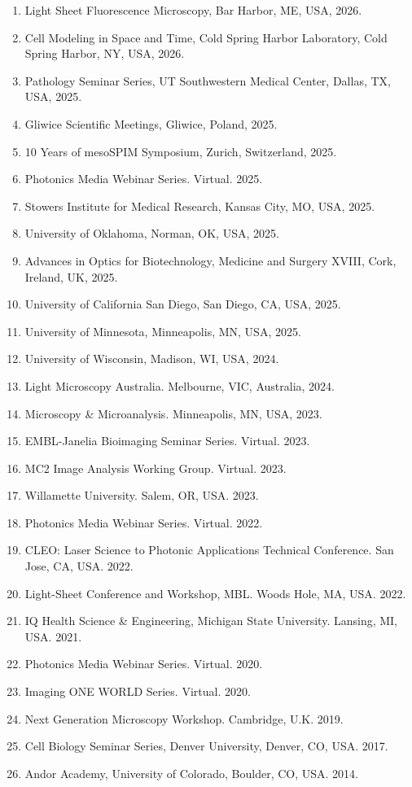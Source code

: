 \begin{enumerate}
\item Light Sheet Fluorescence Microscopy, Bar Harbor, ME, USA, 2026.
\item Cell Modeling in Space and Time, Cold Spring Harbor Laboratory, Cold Spring Harbor, NY, USA, 2026.
\item Pathology Seminar Series, UT Southwestern Medical Center, Dallas, TX, USA, 2025.
\item Gliwice Scientific Meetings, Gliwice, Poland, 2025.
\item 10 Years of mesoSPIM Symposium, Zurich, Switzerland, 2025.
\item Photonics Media Webinar Series. Virtual. 2025.
\item Stowers Institute for Medical Research, Kansas City, MO, USA, 2025.
\item University of Oklahoma, Norman, OK, USA, 2025.
\item Advances in Optics for Biotechnology, Medicine and Surgery XVIII, Cork, Ireland, UK, 2025.
\item University of California San Diego, San Diego, CA, USA, 2025.
\item University of Minnesota, Minneapolis, MN, USA, 2025.
\item University of Wisconsin, Madison, WI, USA, 2024.
\item Light Microscopy Australia. Melbourne, VIC, Australia, 2024.
\item Microscopy \& Microanalysis. Minneapolis, MN, USA, 2023.
\item EMBL-Janelia Bioimaging Seminar Series. Virtual. 2023.
\item MC2 Image Analysis Working Group. Virtual. 2023.
\item Willamette University.  Salem, OR, USA. 2023.
\item Photonics Media Webinar Series.   Virtual. 2022.
\item CLEO: Laser Science to Photonic Applications Technical Conference. San Jose, CA, USA. 2022.
\item Light-Sheet Conference and Workshop, MBL.  Woods Hole, MA, USA. 2022.
\item IQ Health Science \& Engineering, Michigan State University. Lansing, MI, USA. 2021.
\item Photonics Media Webinar Series.  Virtual. 2020.
\item Imaging ONE WORLD Series. Virtual. 2020.
\item Next Generation Microscopy Workshop.  Cambridge, U.K. 2019.
\item Cell Biology Seminar Series, Denver University, Denver, CO, USA. 2017.
\item Andor Academy, University of Colorado, Boulder, CO, USA. 2014.
\end{enumerate}